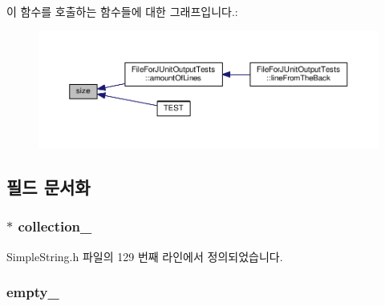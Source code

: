 이 함수를 호출하는 함수들에 대한 그래프입니다.\+:
\nopagebreak
\begin{figure}[H]
\begin{center}
\leavevmode
\includegraphics[width=350pt]{class_simple_string_collection_aac782da1f912bceb5d8ad00c8dc892ac_icgraph}
\end{center}
\end{figure}




\subsection{필드 문서화}
\subsubsection[{\texorpdfstring{collection\+\_\+}{collection_}}]{$\ast$ collection\+\_\+\hspace{0.3cm}{\ttfamily [private]}}\hypertarget{class_simple_string_collection_a1d5eea5beddab4b3a1384f36b6fcba16}{}\label{class_simple_string_collection_a1d5eea5beddab4b3a1384f36b6fcba16}


Simple\+String.\+h 파일의 129 번째 라인에서 정의되었습니다.

\subsubsection[{\texorpdfstring{empty\+\_\+}{empty_}}]{ empty\+\_\+\hspace{0.3cm}{\ttfamily [private]}}\hypertarget{class_simple_string_collection_a2f2d5714c0ff87228405912d39c739a0}{}\label{class_simple_string_collection_a2f2d5714c0ff87228405912d39c739a0}


